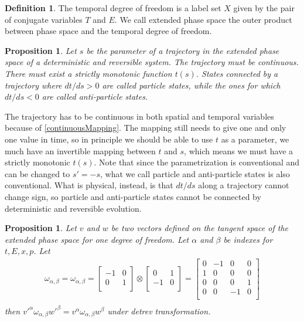 \documentclass[twocolumn,floatfix,nofootinbib]{revtex4}   %
\theoremstyle{theorem}
\newtheorem{prop}[thm]{Proposition}
\theoremstyle{definition}
\newtheorem{defn}[thm]{Definition}
\begin{document}
\begin{defn}\label{tdof}
The temporal degree of freedom is a label set $X$ given by the pair of conjugate variables $T$ and $E$. We call extended phase space the outer product between phase space and the temporal degree of freedom.
\end{defn}

\begin{prop}\label{tdofMonotonic}
Let $s$ be the parameter of a trajectory in the extended phase space of a deterministic and reversible system. The trajectory must be continuous. There must exist a strictly monotonic function $t(s)$. States connected by a trajectory where $dt/ds>0$ are called particle states, while the ones for which $dt/ds<0$ are called anti-particle states.
\end{prop}

The trajectory has to be continuous in both spatial and temporal variables because of \ref{continuousMapping}. The mapping still needs to give one and only one value in time, so in principle we should be able to use $t$ as a parameter, we much have an invertible mapping between $t$ and $s$, which means we must have a strictly monotonic $t(s)$. Note that since the parametrization is conventional and can be changed to $s'=-s$, what we call particle and anti-particle states is also conventional. What is physical, instead, is that $dt/ds$ along a trajectory cannot change sign, so particle and anti-particle states cannot be connected by deterministic and reversible evolution.

\begin{prop}\label{tdofInvariant}
Let $v$ and $w$ be two vectors defined on the tangent space of the extended phase space for one degree of freedom. Let $\alpha$ and $\beta$ be indexes for $t, E, x, p$. Let
\begin{align*}
\omega_{\alpha, \beta} = \omega_{\alpha, \beta} =  \left[
  \begin{array}{cc}
    -1 & 0 \\
    0 & 1 \\
  \end{array}
\right] \otimes \left[
  \begin{array}{cc}
    0 & 1 \\
    -1 & 0 \\
  \end{array}
\right]
= \left[
  \begin{array}{cccc}
    0 & -1 & 0 & 0 \\
    1 & 0 & 0 & 0 \\
    0 & 0 & 0 & 1 \\
    0 & 0 & -1 & 0 \\
  \end{array}
\right] \\
\end{align*}
then $v'^{\alpha} \omega_{\alpha, \beta} w'^{\beta}=v^{\alpha} \omega_{\alpha, \beta} w^{\beta}$ under detrev transformation.
\end{prop}
\end{document}
